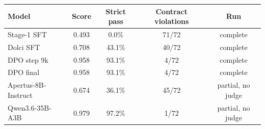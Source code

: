 \begin{tabular}{lcccc}
\toprule
Model & Score & Strict pass & Contract violations & Run \\
\midrule
Stage-1 SFT & 0.493 & 0.0\% & 71/72 & complete \\
Dolci SFT & 0.708 & 43.1\% & 40/72 & complete \\
DPO step 9k & 0.958 & 93.1\% & 4/72 & complete \\
DPO final & 0.958 & 93.1\% & 4/72 & complete \\
Apertus-8B-Instruct & 0.674 & 36.1\% & 45/72 & partial, no judge \\
Qwen3.6-35B-A3B & 0.979 & 97.2\% & 1/72 & partial, no judge \\
\bottomrule
\end{tabular}
